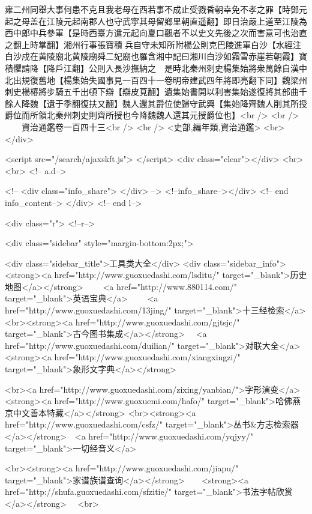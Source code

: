 雍二州同舉大事何患不克且我老母在西若事不成止受戮昏朝幸免不孝之罪【時鄧元起之母盖在江陵元起南郡人也守武寜其母留鄉里朝直遥翻】即日治嚴上道至江陵為西中郎中兵參軍【是時西臺方遣元起向夏口觀者不以史文先後之次而害意可也治直之翻上時掌翻】湘州行事張寶積兵自守未知所附楊公則克巴陵進軍白沙【水經注白沙戍在黄陵廟北黄陵廟舜二妃廟也羅含湘中記曰湘川白沙如霜雪赤崖若朝霞】寶積懼請降【降戶江翻】公則入長沙撫納之　是時北秦州刺史楊集始將衆萬餘自漢中北出規復舊地【楊集始失國事見一百四十一卷明帝建武四年將即亮翻下同】魏梁州刺史楊椿將步騎五千出頓下辯【辯皮莧翻】遺集始書開以利害集始遂復將其部曲千餘人降魏【遺于季翻復扶又翻】魏人還其爵位使歸守武興【集始降齊魏人削其所授爵位而所領北秦州刺史則齊所授也今降魏魏人還其元授爵位也】<br />
<br />
　　資治通鑑卷一百四十三<br />
<br />
<史部,編年類,資治通鑑>  <br>
   </div> 

<script src="/search/ajaxskft.js"> </script>
 <div class="clear"></div>
<br>
<br>
 <!-- a.d-->

 <!--
<div class="info_share">
</div> 
-->
 <!--info_share--></div>   <!-- end info_content-->
  </div> <!-- end l-->

<div class="r">   <!--r-->



<div class="sidebar"  style="margin-bottom:2px;">

 
<div class="sidebar_title">工具类大全</div>
<div class="sidebar_info">
<strong><a href="http://www.guoxuedashi.com/lsditu/" target="_blank">历史地图</a></strong>　　
<a href="http://www.880114.com/" target="_blank">英语宝典</a>　　
<a href="http://www.guoxuedashi.com/13jing/" target="_blank">十三经检索</a>　
<br><strong><a href="http://www.guoxuedashi.com/gjtsjc/" target="_blank">古今图书集成</a></strong>　
<a href="http://www.guoxuedashi.com/duilian/" target="_blank">对联大全</a>　<strong><a href="http://www.guoxuedashi.com/xiangxingzi/" target="_blank">象形文字典</a></strong>　

<br><a href="http://www.guoxuedashi.com/zixing/yanbian/">字形演变</a>　　<strong><a href="http://www.guoxuemi.com/hafo/" target="_blank">哈佛燕京中文善本特藏</a></strong>
<br><strong><a href="http://www.guoxuedashi.com/csfz/" target="_blank">丛书&方志检索器</a></strong>　<a href="http://www.guoxuedashi.com/yqjyy/" target="_blank">一切经音义</a>　　

<br><strong><a href="http://www.guoxuedashi.com/jiapu/" target="_blank">家谱族谱查询</a></strong>　　<strong><a href="http://shufa.guoxuedashi.com/sfzitie/" target="_blank">书法字帖欣赏</a></strong>　
<br>

